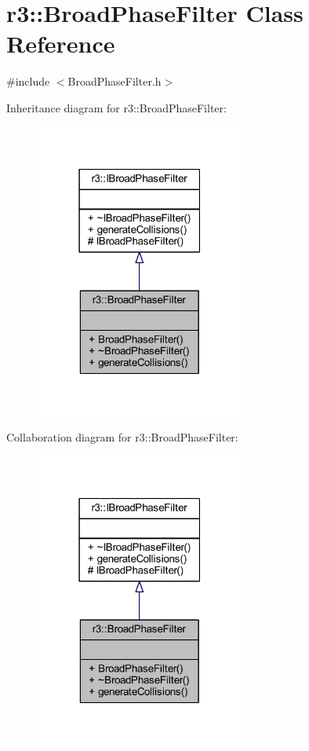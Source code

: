 \hypertarget{classr3_1_1_broad_phase_filter}{}\section{r3\+:\+:Broad\+Phase\+Filter Class Reference}
\label{classr3_1_1_broad_phase_filter}


{\ttfamily \#include $<$Broad\+Phase\+Filter.\+h$>$}



Inheritance diagram for r3\+:\+:Broad\+Phase\+Filter\+:\nopagebreak
\begin{figure}[H]
\begin{center}
\leavevmode
\includegraphics[width=195pt]{classr3_1_1_broad_phase_filter__inherit__graph}
\end{center}
\end{figure}


Collaboration diagram for r3\+:\+:Broad\+Phase\+Filter\+:\nopagebreak
\begin{figure}[H]
\begin{center}
\leavevmode
\includegraphics[width=195pt]{classr3_1_1_broad_phase_filter__coll__graph}
\end{center}
\end{figure}
